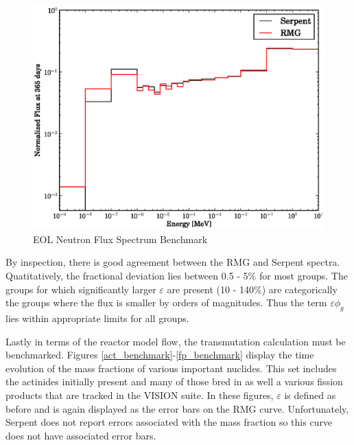\begin{figure}[htbp]
\caption{EOL Neutron Flux Spectrum Benchmark}
\label{spec_EOL}
\begin{center}
\includegraphics[scale=0.5]{multigroup_method/figs/benchmark/Normalized_Flux_at_365_days.eps}
\end{center}
\end{figure}
By inspection, there is good agreement between the RMG and Serpent spectra.  Quatitatively, 
the fractional deviation lies between 0.5 - 5\% for most groups.  The groups for which 
significantly larger $\varepsilon$ are present (10 - 140\%) are categorically the groups 
where the flux is smaller by orders of magnitudes.  Thus the term $\varepsilon\phi_g$ lies
within appropriate limits for all groups.

Lastly in terms of the reactor model flow, the transmutation calculation must be benchmarked.
Figures \ref{act_benchmark}-\ref{fp_benchmark} display the time evolution of the mass 
fractions of various important nuclides. This set includes the actinides initially present and 
many of those bred in as well a various fission products that are tracked in the VISION suite.  
In these figures, $\varepsilon$ is defined as before and is again displayed as the error bars on 
the RMG curve.   Unfortunately, Serpent does not report errors associated with the mass fraction 
so this curve does not have associated error bars.

